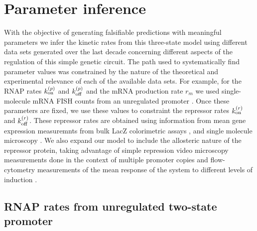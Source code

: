 \section{Parameter inference}

With the objective of generating falsifiable predictions with meaningful
parameters we infer the kinetic rates from this three-state model using
different data sets generated over the last decade concerning different aspects
of the regulation of this simple genetic circuit. The path used to
systematically find parameter values was constrained by the nature of the
theoretical and experimental relevance of each of the available data sets. For
example, for the RNAP rates $k^{(p)}_{\text{on}}$ and $k^{(p)}_{\text{off}}$ and the mRNA production rate
$r_m$ we used single-molecule mRNA FISH counts from an unregulated promoter
\cite{Jones2014a}. Once these parameters are fixed, we use these values to
constraint the repressor rates $k^{(r)}_{\text{on}}$ and $k^{(r)}_{\text{off}}$. These repressor rates are
obtained using information from mean gene expression measuremnts from bulk LacZ
colorimetric assays \cite{Garcia2011c}, and single molecule microscopy
\cite{Elf2007}. We also expand our model to include the allosteric nature of the
repressor protein, taking advantage of simple repression video microscopy
measurements done in the context of multiple promoter copies \cite{Brewster2014}
and flow-cytometry measurements of the mean response of the system to different
levels of induction \cite{Razo-Mejia2018}.

\subsection{RNAP rates from unregulated two-state promoter}

